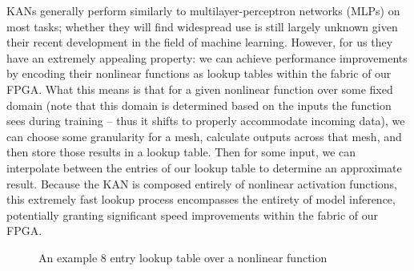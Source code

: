 \documentclass[psamsfonts]{amsart}
\theoremstyle{definition}
\theoremstyle{remark}
\numberwithin{equation}{section}
\begin{document}
KANs generally perform similarly to multilayer-perceptron networks (MLPs) on most tasks; whether they will find widespread use is still largely unknown given their recent development in the field of machine learning. However, for us they have an extremely appealing property: we can achieve performance improvements by encoding their nonlinear functions as lookup tables within the fabric of our FPGA. What this means is that for a given nonlinear function over some fixed domain (note that this domain is determined based on the inputs the function sees during training -- thus it shifts to properly accommodate incoming data), we can choose some granularity for a mesh, calculate outputs across that mesh, and then store those results in a lookup table. Then for some input, we can interpolate between the entries of our lookup table to determine an approximate result. Because the KAN is composed entirely of nonlinear activation functions, this extremely fast lookup process encompasses the entirety of model inference, potentially granting significant speed improvements within the fabric of our FPGA.

\begin{figure}[H]
  \caption{An example 8 entry lookup table over a nonlinear function}
  \label{fig:lkup-diagram}
\end{figure}
\end{document}
